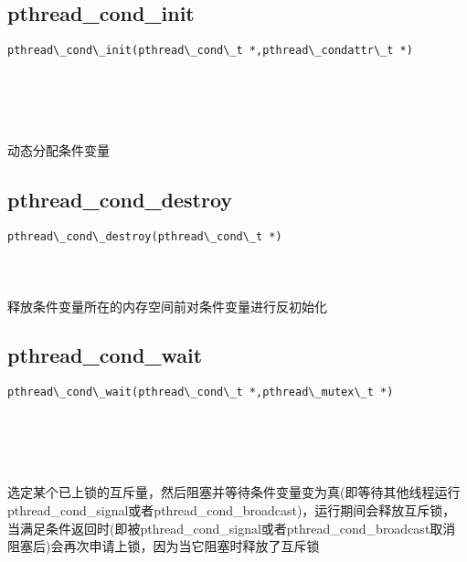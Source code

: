 \documentclass[10pt,a4paper]{article}
\begin{document}
\subsection{pthread\_cond\_init}
\begin{spacing}{2.0}
\lstset{language=C,numbers=none}
\begin{lstlisting}
pthread\_cond\_init(pthread\_cond\_t *,pthread\_condattr\_t *)
\end{lstlisting}
{\large\color[rgb]{0.2,0.4,0.6}{*:}} \\
{\large\color[rgb]{0.2,0.4,0.6}{*:}}
\paragraph{ \ \ }动态分配条件变量
\end{spacing}

\subsection{pthread\_cond\_destroy}
\begin{spacing}{2.0}
\lstset{language=C,numbers=none}
\begin{lstlisting}
pthread\_cond\_destroy(pthread\_cond\_t *)
\end{lstlisting}
{\large\color[rgb]{0.2,0.4,0.6}{*:}}
\paragraph{ \ \ }释放条件变量所在的内存空间前对条件变量进行反初始化
\end{spacing}

\subsection{pthread\_cond\_wait}
\begin{spacing}{2.0}
\lstset{language=C,numbers=none}
\begin{lstlisting}
pthread\_cond\_wait(pthread\_cond\_t *,pthread\_mutex\_t *)
\end{lstlisting}
{\large\color[rgb]{0.2,0.4,0.6}{*:}} \\
{\large\color[rgb]{0.2,0.4,0.6}{*:}}
\paragraph{ \ \ }选定某个已上锁的互斥量，然后阻塞并等待条件变量变为真(即等待其他线程运行pthread\_cond\_signal或者pthread\_cond\_broadcast)，运行期间会释放互斥锁，当满足条件返回时(即被pthread\_cond\_signal或者pthread\_cond\_broadcast取消阻塞后)会再次申请上锁，因为当它阻塞时释放了互斥锁
\end{spacing}
\end{document}
